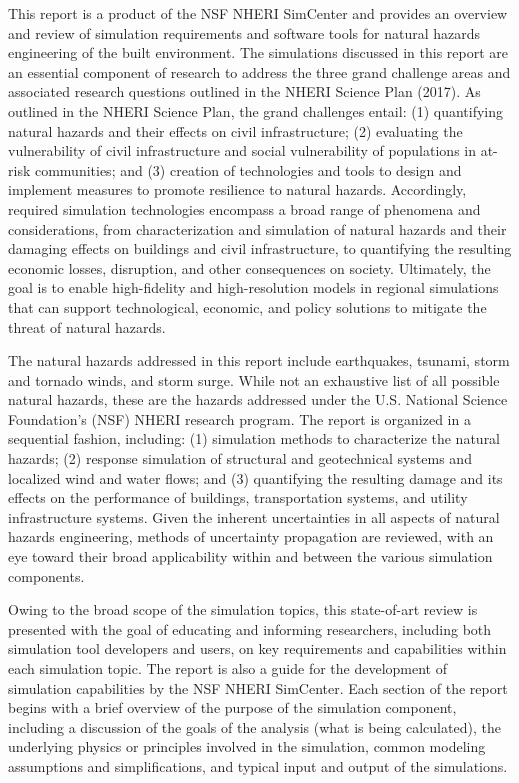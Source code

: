 %
%

\preface

This report is a product of the NSF NHERI SimCenter and provides an overview and review of simulation requirements and software tools for natural hazards engineering of the built environment. The simulations discussed in this report are an essential component of research to address the three grand challenge areas and associated research questions outlined in the NHERI Science Plan (2017). As outlined in the NHERI Science Plan, the grand challenges entail: (1) quantifying natural hazards and their effects on civil infrastructure; (2) evaluating the vulnerability of civil infrastructure and social vulnerability of populations in at-risk communities; and (3) creation of technologies and tools to design and implement measures to promote resilience to natural hazards. Accordingly, required simulation technologies encompass a broad range of phenomena and considerations, from characterization and simulation of natural hazards and their damaging effects on buildings and civil infrastructure, to quantifying the resulting economic losses, disruption, and other consequences on society. Ultimately, the goal is to enable high-fidelity and high-resolution models in regional simulations that can support technological, economic, and policy solutions to mitigate the threat of natural hazards.

The natural hazards addressed in this report include earthquakes, tsunami, storm and tornado winds, and storm surge. While not an exhaustive list of all possible natural hazards, these are the hazards addressed under the U.S. National Science Foundation's (NSF) NHERI research program. The report is organized in a sequential fashion, including: (1) simulation methods to characterize the natural hazards; (2) response simulation of structural and geotechnical systems and localized wind and water flows; and (3) quantifying the resulting damage and its effects on the performance of buildings, transportation systems, and utility infrastructure systems. Given the inherent uncertainties in all aspects of natural hazards engineering, methods of uncertainty propagation are reviewed, with an eye toward their broad applicability within and between the various simulation components.

Owing to the broad scope of the simulation topics, this state-of-art review is presented with the goal of educating and informing researchers, including both simulation tool developers and users, on key requirements and capabilities within each simulation topic. The report is also a guide for the development of simulation capabilities by the NSF NHERI SimCenter. Each section of the report begins with a brief overview of the purpose of the simulation component, including a discussion of the goals of the analysis (what is being calculated), the underlying physics or principles involved in the simulation, common modeling assumptions and simplifications, and typical input and output of the simulations. 

